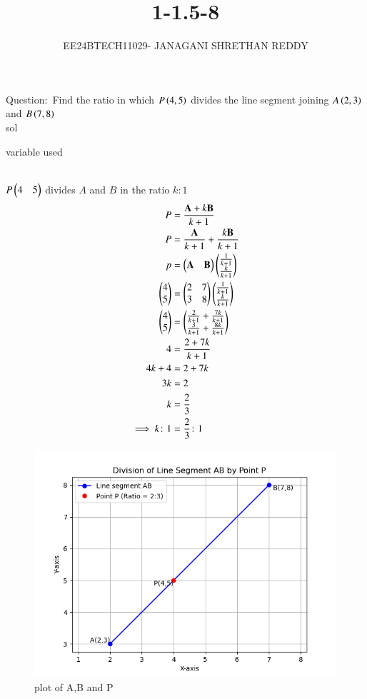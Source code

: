 \documentclass[journal]{IEEEtran}
\begin{document}
 


\vspace{3cm}

\title{1-1.5-8}
\author{EE24BTECH11029- JANAGANI SHRETHAN REDDY}
\maketitle
\bigskip
\renewcommand{\thefigure}{\theenumi}
\renewcommand{\thetable}{\theenumi}

Question$\colon$
     Find the ratio in which $P\left(4,5\right)$ divides the line segment joining $A\left(2,3\right)$ and $B\left(7,8\right)$\\

sol
\begin{table}[h!]
 \centering
 
 \caption{variable used}
\end{table}\\
 $P\begin{pmatrix}4&5\end{pmatrix}$ divides $A$ and $B$ in the ratio $k\colon1$
\begin{align}
    P&=\frac{\vec{A}+k\vec{B}}{k+1}\\
P&=\frac{\vec{A}}{k+1}+\frac{k\vec{B}}{k+1}\\
p&=\myvec{\Vec{A}&\Vec{B}}\myvec{\frac{1}{k+1}\\\frac{k}{k+1}}\\
\myvec{4\\5}&=\myvec{2&7\\3&8}\myvec{\frac{1}{k+1}\\\frac{k}{k+1}}\\
\myvec{4\\5}&=\myvec{\frac{2}{k+1}+\frac{7k}{k+1}\\\frac{3}{k+1}+\frac{8k}{k+1}}\\
4&=\frac{2+7k}{k+1}\\
4k+4&=2+7k\\
3k&=2\\
k&=\frac{2}{3}\\
 \implies k\colon1&=\frac{2}{3}\colon1\\
 \end{align}
 \begin{figure}[h!]
  \centering
  \includegraphics[width=1\linewidth]{fig.png}
  \caption{plot of A,B and P}
 \end{figure}
 
\end{document}
